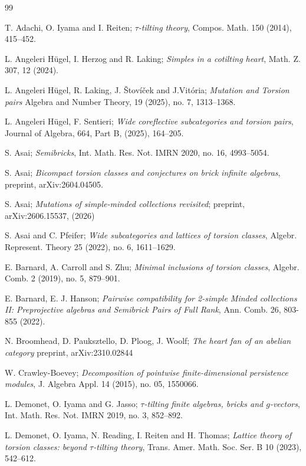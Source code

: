 \documentclass[11pt]{amsart}
\theoremstyle{definition}
\begin{document}
\begin{thebibliography}{99}

T. Adachi, O. Iyama and I. Reiten;
\emph{\(\tau\)-tilting theory},
Compos. Math. 150 (2014), 415--452.

L. Angeleri H\"ugel, I. Herzog and R. Laking;
\emph{Simples in a cotilting heart},
Math. Z. 307, 12 (2024).

L. Angeleri H\"ugel, R. Laking, J. \v{S}tov\'{i}\v{c}ek and J.Vit\'{o}ria;
\emph{Mutation and Torsion pairs}
Algebra and Number Theory, 19 (2025),  no. 7,  1313--1368.

L. Angeleri H\"ugel, F. Sentieri;
\emph{Wide coreflective subcategories and torsion pairs},
Journal of Algebra,
664, Part B,
(2025),
164--205.

S. Asai;
\emph{Semibricks},
Int. Math. Res. Not. IMRN 2020, no. 16, 4993--5054.

S. Asai;
\emph{Bicompact torsion classes and conjectures on brick infinite algebras},
preprint, arXiv:2604.04505.

S. Asai;
\emph{Mutations of simple-minded collections revisited};
preprint, arXiv:2606.15537, (2026)

S. Asai and C. Pfeifer;
\emph{Wide subcategories and lattices of torsion classes},
Algebr. Represent. Theory 25 (2022), no. 6, 1611--1629.

E. Barnard, A. Carroll and S. Zhu;
\emph{Minimal inclusions of torsion classes},
Algebr. Comb. 2 (2019), no. 5, 879--901.

E. Barnard, E. J. Hanson; 
\emph{Pairwise compatibility for 2-simple Minded collections II: Preprojective algebras and Semibrick Pairs of Full Rank},
Ann. Comb. 26, 803-855 (2022).

N. Broomhead, D. Pauksztello, D. Ploog, J. Woolf;
\emph{The heart fan of an abelian category}
preprint, arXiv:2310.02844

W. Crawley-Boevey;
\emph{Decomposition of pointwise finite-dimensional persistence modules},
J. Algebra Appl. 14 (2015), no. 05, 1550066.

L. Demonet, O. Iyama and G. Jasso;
\emph{\(\tau\)-tilting finite algebras, bricks and \(g\)-vectors},
Int. Math. Res. Not. IMRN 2019, no. 3, 852--892.

L. Demonet, O. Iyama, N. Reading, I. Reiten and H. Thomas;
\emph{Lattice theory of torsion classes: beyond \(\tau\)-tilting theory},
Trans. Amer. Math. Soc. Ser. B 10 (2023), 542--612.


\end{thebibliography}
\end{document}
